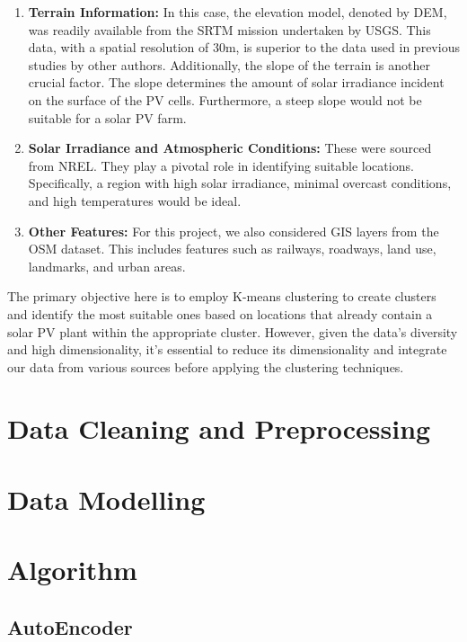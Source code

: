 \documentclass[a4paper,12pt]{Classes/RoboticsLaTeX}
\begin{document}
	\begin{enumerate}
		\item \textbf{Terrain Information:} In this case, the elevation model, denoted by \ac{DEM}, was readily available from the \ac{SRTM} mission undertaken by \ac{USGS}. This data, with a spatial resolution of 30m, is superior to the data used in previous studies by other authors. Additionally, the slope of the terrain is another crucial factor. The slope determines the amount of solar irradiance incident on the surface of the \ac{PV} cells. Furthermore, a steep slope would not be suitable for a solar \ac{PV} farm.
		
		\item \textbf{Solar Irradiance and Atmospheric Conditions:} These were sourced from \ac{NREL}. They play a pivotal role in identifying suitable locations. Specifically, a region with high solar irradiance, minimal overcast conditions, and high temperatures would be ideal.
		
		\item \textbf{Other Features:} For this project, we also considered \ac{GIS} layers from the \ac{OSM} dataset. This includes features such as railways, roadways, land use, landmarks, and urban areas.
	\end{enumerate}
	
	The primary objective here is to employ K-means clustering to create clusters and identify the most suitable ones based on locations that already contain a solar PV plant within the appropriate cluster. 
	However, given the data's diversity and high dimensionality, it's essential to reduce its dimensionality and integrate our data from various sources before applying the clustering techniques.

	\section{Data Cleaning and Preprocessing}

	\section{Data Modelling}

	\section{Algorithm}
	\subsection{AutoEncoder}
\end{document}
